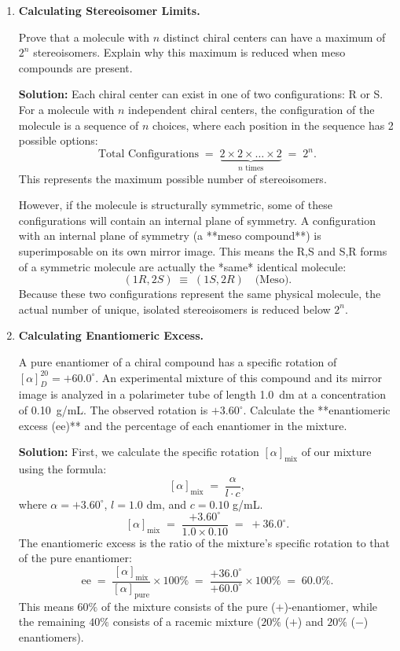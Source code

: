\documentclass[12pt, a4paper]{book}
\begin{document}
\begin{problembox}
\begin{enumerate}[label=\textbf{E\arabic*.}]
  \item \textbf{Calculating Stereoisomer Limits.}
  
        Prove that a molecule with $n$ distinct chiral centers can have a maximum of $2^n$ stereoisomers. Explain why this maximum is reduced when meso compounds are present.
        
        \textbf{Solution:}
        Each chiral center can exist in one of two configurations: R or S.
        For a molecule with $n$ independent chiral centers, the configuration of the molecule is a sequence of $n$ choices, where each position in the sequence has 2 possible options:
        \[
          \text{Total Configurations} \;=\; \underbrace{2 \times 2 \times \dots \times 2}_{n \text{ times}} \;=\; 2^n.
        \]
        This represents the maximum possible number of stereoisomers.
        
        However, if the molecule is structurally symmetric, some of these configurations will contain an internal plane of symmetry.
        A configuration with an internal plane of symmetry (a **meso compound**) is superimposable on its own mirror image. This means the R,S and S,R forms of a symmetric molecule are actually the *same* identical molecule:
        \[
          (1R, 2S) \;\equiv\; (1S, 2R) \quad \text{(Meso)}.
        \]
        Because these two configurations represent the same physical molecule, the actual number of unique, isolated stereoisomers is reduced below $2^n$.
        
  \item \textbf{Calculating Enantiomeric Excess.}
  
        A pure enantiomer of a chiral compound has a specific rotation of $[\alpha]_D^{20} = +60.0^\circ$.
        An experimental mixture of this compound and its mirror image is analyzed in a polarimeter tube of length \SI{1.0}{dm} at a concentration of \SI{0.10}{g/mL}. The observed rotation is $+3.60^\circ$.
        Calculate the **enantiomeric excess (ee)** and the percentage of each enantiomer in the mixture.
        
        \textbf{Solution:}
        First, we calculate the specific rotation $[\alpha]_{\text{mix}}$ of our mixture using the formula:
        \[
          [\alpha]_{\text{mix}} \;=\; \frac{\alpha}{l \cdot c},
        \]
        where $\alpha = +3.60^\circ$, $l = 1.0$ dm, and $c = 0.10$ g/mL.
        \[
          [\alpha]_{\text{mix}} \;=\; \frac{+3.60^\circ}{1.0 \times 0.10} \;=\; +36.0^\circ.
        \]
        The enantiomeric excess is the ratio of the mixture's specific rotation to that of the pure enantiomer:
        \[
          \text{ee} \;=\; \frac{[\alpha]_{\text{mix}}}{[\alpha]_{\text{pure}}} \times 100\% \;=\; \frac{+36.0^\circ}{+60.0^\circ} \times 100\% \;=\; 60.0\%.
        \]
        This means $60\%$ of the mixture consists of the pure ($+$)-enantiomer, while the remaining $40\%$ consists of a racemic mixture ($20\%$ ($+$) and $20\%$ ($-$) enantiomers).
        

\end{enumerate}
\end{problembox}
\end{document}

